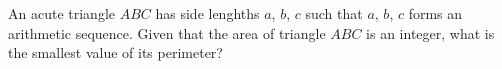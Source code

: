An acute triangle $ABC$ has side lenghths $a$, $b$, $c$ such that $a$, $b$, $c$ forms an arithmetic sequence. Given that the area of triangle $ABC$ is an integer, what is the smallest value of its perimeter?